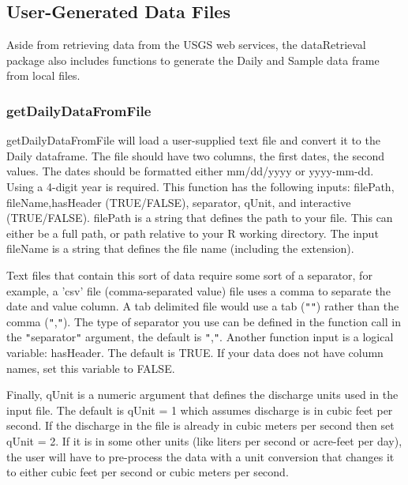 \documentclass[a4paper,11pt]{article}\usepackage[]{graphicx}\usepackage[]{color}
\begin{document}
\FloatBarrier

\subsection{User-Generated Data Files}
Aside from retrieving data from the USGS web services, the dataRetrieval package also includes functions to generate the Daily and Sample data frame from local files.

\subsubsection{getDailyDataFromFile}
getDailyDataFromFile will load a user-supplied text file and convert it to the Daily dataframe. The file should have two columns, the first dates, the second values.  The dates should be formatted either mm/dd/yyyy or yyyy-mm-dd. Using a 4-digit year is required. This function has the following inputs: filePath, fileName,hasHeader (TRUE/FALSE), separator, qUnit, and interactive (TRUE/FALSE). filePath is a string that defines the path to your file. This can either be a full path, or path relative to your R working directory. The input fileName is a string that defines the file name (including the extension).

Text files that contain this sort of data require some sort of a separator, for example, a 'csv' file (comma-separated value) file uses a comma to separate the date and value column. A tab delimited file would use a tab (\texttt{"}\verb@\t@\texttt{"}) rather than the comma (\texttt{"},\texttt{"}). The type of separator you use can be defined in the function call in the \texttt{"}separator\texttt{"} argument, the default is \texttt{"},\texttt{\texttt{"}}. Another function input is a logical variable: hasHeader.  The default is TRUE. If your data does not have column names, set this variable to FALSE.

Finally, qUnit is a numeric argument that defines the discharge units used in the input file.  The default is qUnit = 1 which assumes discharge is in cubic feet per second.  If the discharge in the file is already in cubic meters per second then set qUnit = 2.  If it is in some other units (like liters per second or acre-feet per day), the user will have to pre-process the data with a unit conversion that changes it to either cubic feet per second or cubic meters per second.
\end{document}
